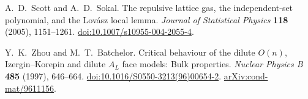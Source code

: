 A.~D.~Scott and A.~D.~Sokal.
The repulsive lattice gas, the independent-set polynomial, and the Lov\'asz local lemma.
\emph{Journal of Statistical Physics} \textbf{118} (2005), 1151--1261.
\href{https://doi.org/10.1007/s10955-004-2055-4}{doi:10.1007/s10955-004-2055-4}.

Y.~K.~Zhou and M.~T.~Batchelor.
Critical behaviour of the dilute $O(n)$, Izergin--Korepin and dilute
$A_L$ face models: Bulk properties.
\emph{Nuclear Physics B} \textbf{485} (1997), 646--664.
\href{https://doi.org/10.1016/S0550-3213(96)00654-2}{doi:10.1016/S0550-3213(96)00654-2}.
\href{https://arxiv.org/abs/cond-mat/9611156}{arXiv:cond-mat/9611156}.
